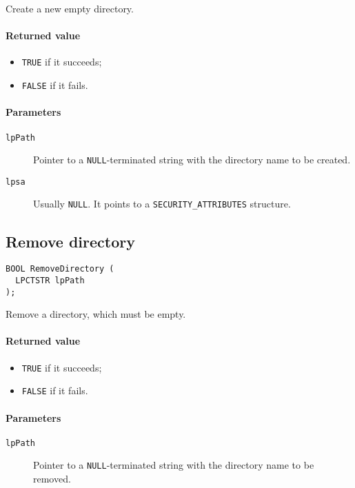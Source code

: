 Create a new empty directory.

\paragraph{Returned value}
\begin{itemize}
\item \texttt{TRUE} if it succeeds;
\item \texttt{FALSE} if it fails.
\end{itemize}

\paragraph{Parameters}
\begin{description}
\item [\texttt{lpPath}] Pointer to a \texttt{NULL}-terminated string with the directory name to be created.
\item [\texttt{lpsa}] Usually \texttt{NULL}. It points to a \texttt{SECURITY\_ATTRIBUTES} structure.
\end{description}

\subsection{Remove directory}
\begin{verbatim}
BOOL RemoveDirectory (
  LPCTSTR lpPath
);
\end{verbatim}

Remove a directory, which must be empty.

\paragraph{Returned value}
\begin{itemize}
\item \texttt{TRUE} if it succeeds;
\item \texttt{FALSE} if it fails.
\end{itemize}

\paragraph{Parameters}
\begin{description}
\item [\texttt{lpPath}] Pointer to a \texttt{NULL}-terminated string with the directory name to be removed.
\end{description}

